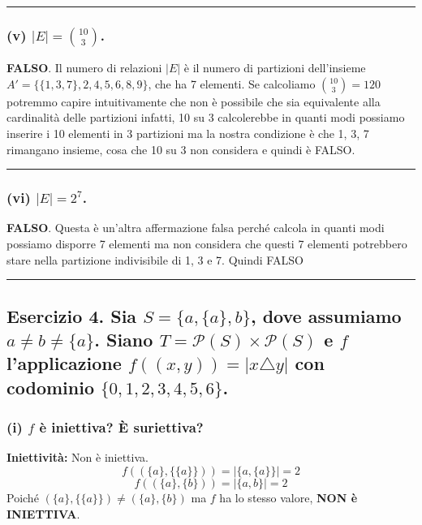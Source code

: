 \vspace{0.3cm}
\hrule
\vspace{0.3cm}

\subsubsection*{(v) $|E| = \binom{10}{3}$.}
\textbf{FALSO}.
Il numero di relazioni $|E|$ è il numero di partizioni dell'insieme $A' = \{\{1, 3, 7\}, 2, 4, 5, 6, 8, 9\}$, che ha 7 elementi. Se calcoliamo $\binom{10}{3} = 120$ 
potremmo capire intuitivamente che non è possibile che sia equivalente alla cardinalità delle partizioni infatti, 10 su 3 calcolerebbe in quanti modi possiamo inserire i 
10 elementi in 3 partizioni ma la nostra condizione è che 1, 3, 7 rimangano insieme, cosa che 10 su 3 non considera e quindi è FALSO.

\vspace{0.3cm}
\hrule
\vspace{0.3cm}

\subsubsection*{(vi) $|E| = 2^7$.}
\textbf{FALSO}.
Questa è un'altra affermazione falsa perché calcola in quanti modi possiamo disporre 7 elementi ma non considera che questi 7 elementi potrebbero stare nella
partizione indivisibile di 1, 3 e 7. Quindi FALSO

\vspace{0.5cm}
\hrule
\vspace{0.5cm}

\subsection*{Esercizio 4. Sia $S = \{a, \{a\}, b\}$, dove assumiamo $a \neq b \neq \{a\}$. Siano $T = \mathcal{P}(S) \times \mathcal{P}(S)$ e $f$ l'applicazione $f((x, y)) = |x \triangle y|$ con codominio $\{0, 1, 2, 3, 4, 5, 6\}$.}

\subsubsection*{(i) $f$ è iniettiva? È suriettiva?}

\textbf{Iniettività:}
Non è iniettiva. 
$$ f((\{a\}, \{\{a\}\})) = |\{a, \{a\}\}| = 2 $$
$$ f((\{a\}, \{b\})) = |\{a, b\}| = 2 $$
Poiché $(\{a\}, \{\{a\}\}) \ne (\{a\}, \{b\})$ ma $f$ ha lo stesso valore, \textbf{NON è INIETTIVA}.

